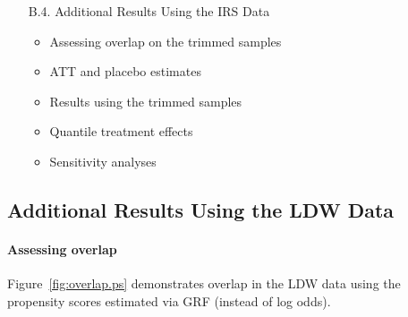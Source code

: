 \documentclass[letterpaper,12pt,leqno]{article}
\begin{document}
{\begin{enumerate}
\begin{itemize}
        \item ATT estimates
        \item CATT estimates
        \item Quantile treatment effects
        \item Placebo test
    \end{itemize}
    \item[B.4.] Additional Results Using the IRS Data
    \vspace{-0.5em}
    \begin{itemize}
        \item Assessing overlap on the trimmed samples
        \item ATT and placebo estimates
        \item Results using the trimmed samples
        \item Quantile treatment effects
        \item Sensitivity analyses
    \end{itemize}    
\end{enumerate}
}

\clearpage




\subsection{Additional Results Using the LDW Data}

\paragraph{Assessing overlap} Figure~\ref{fig:overlap.ps} demonstrates overlap in the LDW data using the propensity scores estimated via GRF (instead of log odds). 
\end{document}
